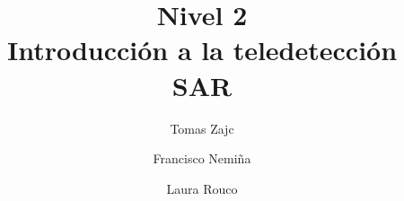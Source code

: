 \documentclass[a4paper,12pt]{book}
\title{{\large Nivel 2} \\ Introducción a la teledetección SAR}
\author{Tomas Zajc \and Francisco Nemiña \and Laura Rouco}
\begin{document}
\maketitle
\titlepage






\end{document}
